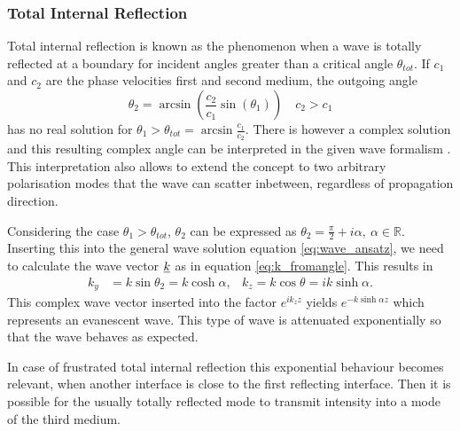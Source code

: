 \subsubsection{Total Internal Reflection}
Total internal reflection is known as the phenomenon when a wave is totally
reflected at a boundary for incident angles greater than a critical angle
$\theta_{tot}$. If $c_1$ and $c_2$ are the phase velocities first and second
medium, the outgoing angle
\begin{equation}
    \theta_2 = \arcsin( \frac{c_2}{c_1} \sin(\theta_1)) \quad c_2 > c_1
\end{equation}
has no real solution for $\theta_1 > \theta_{tot} = \arcsin \frac{c_1}{c_2}$.
There is however a complex solution and this resulting complex angle can be
interpreted in the given wave formalism \cite[5]{brekhovskikh2012waves}. This
interpretation also allows to extend the concept to two arbitrary polarisation
modes that the wave can scatter inbetween, regardless of propagation direction.

Considering the case $\theta_1 > \theta_{tot}$, $\theta_2$ can be expressed as
$\theta_2 = \frac{\pi}{2} + i\alpha,\ \alpha\in\mathbb{R}$. Inserting this into
the general wave solution equation \ref{eq:wave_ansatz}, we need to calculate
the wave vector $\underline{k}$ as in equation \ref{eq:k_fromangle}. This results
in
\begin{align}
    k_y & = k \sin\theta_2 = k \cosh\alpha, & k_z= k \cos\theta = ik \sinh\alpha.
\end{align}
This complex wave vector inserted into the factor $e^{ik_zz}$ yields
$e^{-k\sinh\alpha z}$ which represents an evanescent wave. This type of wave is
attenuated exponentially so that the wave behaves as expected.

In case of frustrated total internal reflection this exponential behaviour
becomes relevant, when another interface is close to the first reflecting
interface. Then it is possible for the usually totally reflected mode to
transmit intensity into a mode of the third medium.

